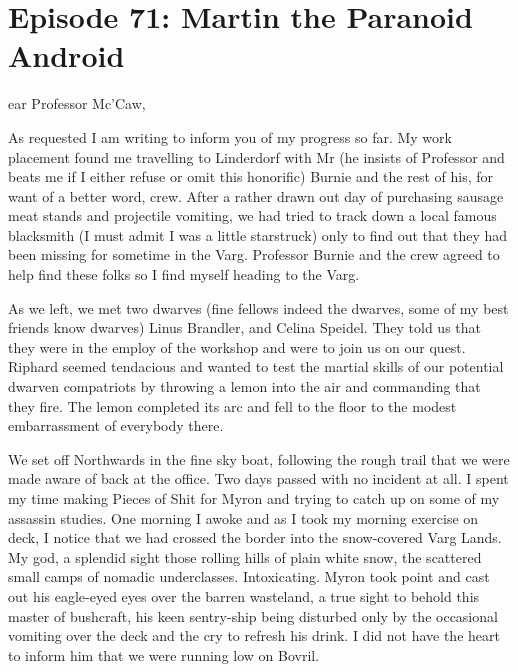 \section{Episode 71: Martin the Paranoid Android}

\medskip

ear Professor Mc’Caw,\medskip

As requested I am writing to inform you of my progress so far. My work placement found me travelling to Linderdorf with Mr (he insists of Professor and beats me if I either refuse or omit this honorific) Burnie and the rest of his, for want of a better word, crew. After a rather drawn out day of purchasing sausage meat stands and projectile vomiting, we had tried to track down a local famous blacksmith (I must admit I was a little starstruck) only to find out that they had been missing for sometime in the Varg. Professor Burnie and the crew agreed to help find these folks so I find myself heading to the Varg.\medskip

As we left, we met two dwarves (fine fellows indeed the dwarves, some of my best friends know dwarves) Linus Brandler, and Celina Speidel. They told us that they were in the employ of the workshop and were to join us on our quest. Riphard seemed tendacious and wanted to test the martial skills of our potential dwarven compatriots by throwing a lemon into the air and commanding that they fire. The lemon completed its arc and fell to the floor to the modest embarrassment of everybody there.\medskip

We set off Northwards in the fine sky boat, following the rough trail that we were made aware of back at the office. Two days passed with no incident at all. I spent my time making Pieces of Shit for Myron and trying to catch up on some of my assassin studies. One morning I awoke and as I took my morning exercise on deck, I notice that we had crossed the border into the snow-covered Varg Lands. My god, a splendid sight those rolling hills of plain white snow, the scattered small camps of nomadic underclasses. Intoxicating. Myron took point and cast out his eagle-eyed eyes over the barren wasteland, a true sight to behold this master of bushcraft, his keen sentry-ship being disturbed only by the occasional vomiting over the deck and the cry to refresh his drink. I did not have the heart to inform him that we were running low on Bovril.\medskip

